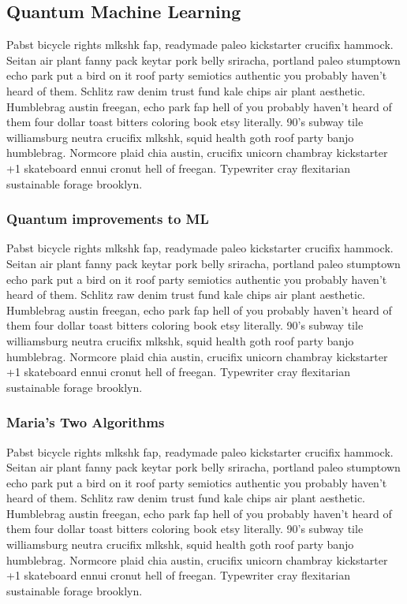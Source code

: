 \documentclass[a4paper]{article}
\begin{document}
\subsection{Quantum Machine Learning}
\label{subsec:quantummachinelearning}


Pabst bicycle rights mlkshk fap, readymade paleo kickstarter crucifix hammock. Seitan air plant fanny pack keytar pork belly sriracha, portland paleo stumptown echo park put a bird on it roof party semiotics authentic you probably haven't heard of them. Schlitz raw denim trust fund kale chips air plant aesthetic. Humblebrag austin freegan, echo park fap hell of you probably haven't heard of them four dollar toast bitters coloring book etsy literally. 90's subway tile williamsburg neutra crucifix mlkshk, squid health goth roof party banjo humblebrag. Normcore plaid chia austin, crucifix unicorn chambray kickstarter +1 skateboard ennui cronut hell of freegan. Typewriter cray flexitarian sustainable forage brooklyn.


\subsubsection{Quantum improvements to ML}
\label{subsubsec:quantumimprovements}


Pabst bicycle rights mlkshk fap, readymade paleo kickstarter crucifix hammock. Seitan air plant fanny pack keytar pork belly sriracha, portland paleo stumptown echo park put a bird on it roof party semiotics authentic you probably haven't heard of them. Schlitz raw denim trust fund kale chips air plant aesthetic. Humblebrag austin freegan, echo park fap hell of you probably haven't heard of them four dollar toast bitters coloring book etsy literally. 90's subway tile williamsburg neutra crucifix mlkshk, squid health goth roof party banjo humblebrag. Normcore plaid chia austin, crucifix unicorn chambray kickstarter +1 skateboard ennui cronut hell of freegan. Typewriter cray flexitarian sustainable forage brooklyn.

\subsubsection{Maria's Two Algorithms}
\label{subsubsec:mariasalgorithms}


Pabst bicycle rights mlkshk fap, readymade paleo kickstarter crucifix hammock. Seitan air plant fanny pack keytar pork belly sriracha, portland paleo stumptown echo park put a bird on it roof party semiotics authentic you probably haven't heard of them. Schlitz raw denim trust fund kale chips air plant aesthetic. Humblebrag austin freegan, echo park fap hell of you probably haven't heard of them four dollar toast bitters coloring book etsy literally. 90's subway tile williamsburg neutra crucifix mlkshk, squid health goth roof party banjo humblebrag. Normcore plaid chia austin, crucifix unicorn chambray kickstarter +1 skateboard ennui cronut hell of freegan. Typewriter cray flexitarian sustainable forage brooklyn.
\end{document}
